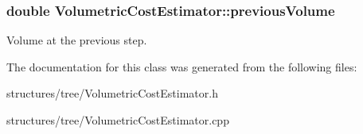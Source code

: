 \subsubsection[{\texorpdfstring{previous\+Volume}{previousVolume}}]{\setlength{\rightskip}{0pt plus 5cm}double Volumetric\+Cost\+Estimator\+::previous\+Volume\hspace{0.3cm}{\ttfamily [private]}}\hypertarget{class_volumetric_cost_estimator_a2671d960beddc83b44d1a8f65866e905}{}\label{class_volumetric_cost_estimator_a2671d960beddc83b44d1a8f65866e905}
Volume at the previous step. 

The documentation for this class was generated from the following files\+:\begin{DoxyCompactItemize}
\item 
structures/tree/Volumetric\+Cost\+Estimator.\+h\item 
structures/tree/Volumetric\+Cost\+Estimator.\+cpp\end{DoxyCompactItemize}
